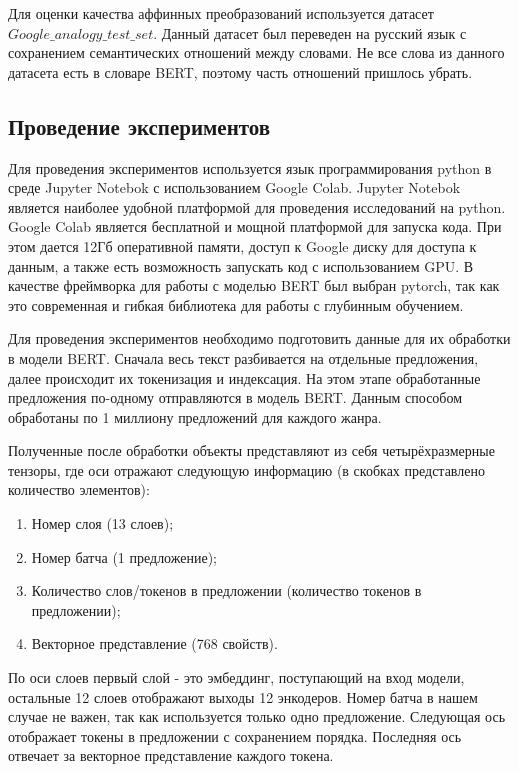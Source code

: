 \documentclass[a4paper,14pt]{article}
\begin{document}
	Для оценки качества аффинных преобразований используется датасет $Google\_analogy\_test\_set$.
	Данный датасет был переведен на русский язык с сохранением семантических отношений между словами.
	Не все слова из данного датасета есть в словаре BERT, поэтому часть отношений пришлось убрать.
	
	\subsection{Проведение экспериментов}
	
	Для проведения экспериментов используется язык программирования python в среде Jupyter Notebok с использованием Google Colab.
	Jupyter Notebok является наиболее удобной платформой для проведения исследований на python.
	Google Colab является бесплатной и мощной платформой для запуска кода.
	При этом дается 12Гб оперативной памяти, доступ к Google диску для доступа к данным, а также есть возможность запускать код с использованием GPU.
	В качестве фреймворка для работы с моделью BERT был выбран pytorch, так как это современная и гибкая библиотека для работы с глубинным обучением.
	
	Для проведения экспериментов необходимо подготовить данные для их обработки в модели BERT.
	Сначала весь текст разбивается на отдельные предложения, далее происходит их токенизация и индексация.
	На этом этапе обработанные предложения по-одному отправляются в модель BERT.
	Данным способом обработаны по 1 миллиону предложений для каждого жанра.
	
	Полученные после обработки объекты представляют из себя четырёхразмерные тензоры, где оси отражают следующую информацию (в скобках представлено количество элементов):
	
	\begin{enumerate}
		
		\item Номер слоя (13 слоев);
		
		\item Номер батча (1 предложение);
		
		\item Количество слов/токенов в предложении (количество токенов в предложении);
		
		\item Векторное представление (768 свойств).

	\end{enumerate}	

	По оси слоев первый слой - это эмбеддинг, поступающий на вход модели, остальные 12 слоев отображают выходы 12 энкодеров.
	Номер батча в нашем случае не важен, так как используется только одно предложение.
	Следующая ось отображает токены в предложении с сохранением порядка.
	Последняя ось отвечает за векторное представление каждого токена.
	
\end{document}

